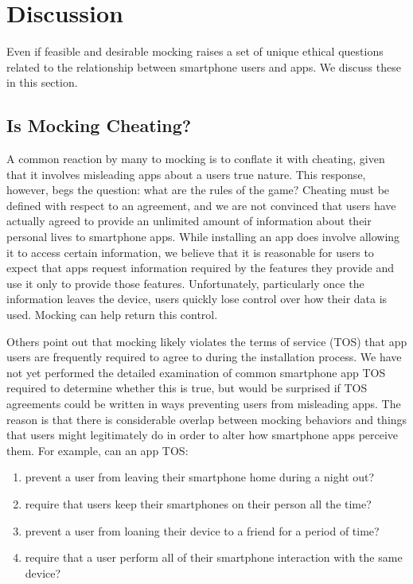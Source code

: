 \section{Discussion}
\label{sec-discussion}

Even if feasible and desirable mocking raises a set of unique ethical
questions related to the relationship between smartphone users and apps. We
discuss these in this section.

\subsection{Is Mocking Cheating?}

A common reaction by many to mocking is to conflate it with cheating, given
that it involves misleading apps about a users true nature. This response,
however, begs the question: what are the rules of the game? Cheating must be
defined with respect to an agreement, and we are not convinced that users
have actually agreed to provide an unlimited amount of information about
their personal lives to smartphone apps. While installing an app does involve
allowing it to access certain information, we believe that it is reasonable
for users to expect that apps request information required by the features
they provide and use it only to provide those features. Unfortunately,
particularly once the information leaves the device, users quickly lose
control over how their data is used. Mocking can help return this control.

Others point out that mocking likely violates the terms of service (TOS) that
app users are frequently required to agree to during the installation
process. We have not yet performed the detailed examination of common
smartphone app TOS required to determine whether this is true, but would be
surprised if TOS agreements could be written in ways preventing users from
misleading apps. The reason is that there is considerable overlap between
mocking behaviors and things that users might legitimately do in order to
alter how smartphone apps perceive them. For example, can an app TOS:

\begin{enumerate}

\item prevent a user from leaving their smartphone home during a night out?

\item require that users keep their smartphones on their person all the time?

\item prevent a user from loaning their device to a friend for a period of
time?

\item require that a user perform all of their smartphone interaction with
the same device?

\end{enumerate}

